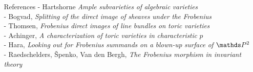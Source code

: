 \documentclass[beamer]{paper}
\begin{document}
\begin{frame}[t]{References}
  \scriptsize{
    - Hartshorne \hfill\textit{Ample subvarieties of algebraic varieties} \\
    - Bogvad, \hfill\textit{Splitting of the direct image of sheaves under the Frobenius} \\
    - Thomsen, \hfill\textit{Frobenius direct images of line bundles on toric varieties} \\
    - Achinger, \hfill\textit{A characterization of toric varieties in characteristic $p$} \\
    - Hara, \hfill\textit{Looking out for Frobenius summands on a blown-up surface of $\PP2$} \\
    - Raedschelders, Špenko, Van den Bergh, \hfill\textit{The Frobenius morphism in invariant theory}
  }

  \renewcommand{\section}{\subsection}
  \printbibliography
\end{frame}
\end{document}
